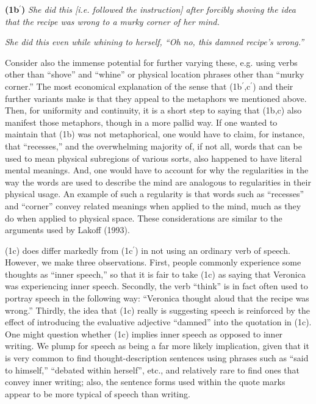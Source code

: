 \addtolength{\baselineskip}{-.375\baselineskip}

{\bf (1b$^\prime$)}
{\it She did this [i.e. followed the instruction] after forcibly shoving the idea
that the recipe was wrong to a murky corner of her mind.}

{\it She did this  even while whining to herself, ``Oh no, this damned recipe's wrong.''}


\addtolength{\baselineskip}{+.6\baselineskip}

\noindent
Consider also the immense potential for further varying these, e.g. using verbs
other than ``shove'' and ``whine'' or physical location phrases other than
``murky corner.''  The most economical explanation of the sense that
(1b$^\prime$,c$^\prime$) and their further variants make is that they appeal to
the metaphors we mentioned above.  Then, for uniformity and continuity, it is a
short step to saying that (1b,c) also manifest those metaphors, though in a
more pallid way.  If one wanted to maintain that (1b) was not metaphorical, one
would have to claim, for instance, that ``recesses,'' and the overwhelming
majority of, if not all, words that can be used to mean physical subregions of
various sorts, also happened to have literal mental meanings.  And, one would
have to account for why the regularities in the way the words are used to
describe the mind are analogous to regularities in their physical usage. An
example of such a regularity is that words such as ``recesses'' and ``corner''
convey related meanings when applied to the mind, much as they do when applied
to physical space. These considerations are similar to the arguments used by
Lakoff (1993).

(1c) does differ markedly from (1c$^\prime$) in not using an ordinary verb of
speech. However, we make three observations. First, people commonly experience
some thoughts as ``inner speech,'' so that it is fair to take (1c) as saying
that Veronica was experiencing inner speech. Secondly, the verb ``think'' is in
fact often used to portray speech in the following way: ``Veronica thought
aloud that the recipe was wrong.'' Thirdly, the idea that (1c) really is
suggesting speech is reinforced by the effect of introducing the evaluative
adjective ``damned'' into the quotation in (1c).  One might question whether
(1c) implies inner speech as opposed to inner writing.  We plump for speech as
being a far more likely implication, given that it is very common to find
thought-description sentences using phrases such as ``said to himself,''
``debated within herself'', etc., and relatively rare to find ones that convey
inner writing; also, the sentence forms used within the quote marks appear to
be more typical of speech than writing.

